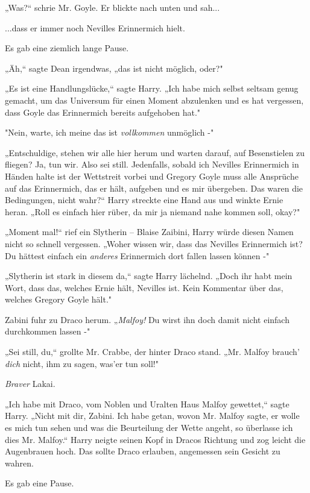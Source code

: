 {„Was?“ schrie Mr. Goyle. Er blickte nach unten und sah...

...dass er immer noch Nevilles Erinnermich hielt.

Es gab eine ziemlich lange Pause.

„Äh,“ sagte Dean irgendwas, „das ist nicht möglich, oder?"

„Es ist eine Handlungslücke,“ sagte Harry. „Ich habe mich selbst seltsam genug gemacht, um das Universum für einen Moment abzulenken und es hat vergessen, dass Goyle das Erinnermich bereits aufgehoben hat."

"Nein, warte, ich meine das ist \emph{vollkommen} unmöglich -"

„Entschuldige, stehen wir alle hier herum und warten darauf, auf Besenstielen zu fliegen? Ja, tun wir. Also sei still. Jedenfalls, sobald ich Nevilles Erinnermich in Händen halte ist der Wettstreit vorbei und Gregory Goyle muss alle Ansprüche auf das Erinnermich, das er hält, aufgeben und es mir übergeben. Das waren die Bedingungen, nicht wahr?“ Harry streckte eine Hand aus und winkte Ernie heran. „Roll es einfach hier rüber, da mir ja niemand nahe kommen soll, okay?"

„Moment mal!“ rief ein Slytherin -- Blaise Zaibini, Harry würde diesen Namen nicht so schnell vergessen. „Woher wissen wir, dass das Nevilles Erinnermich ist? Du hättest einfach ein \emph{anderes} Erinnermich dort fallen lassen können -"

„Slytherin ist stark in diesem da,“ sagte Harry lächelnd. „Doch ihr habt mein Wort, dass das, welches Ernie hält, Nevilles ist. Kein Kommentar über das, welches Gregory Goyle hält."

Zabini fuhr zu Draco herum. „\emph{Malfoy!} Du wirst ihn doch damit nicht einfach durchkommen lassen -"

„Sei still, du,“ grollte Mr. Crabbe, der hinter Draco stand. „Mr. Malfoy brauch' \emph{dich} nicht, ihm zu sagen, was'er tun soll!"

\emph{Braver} Lakai.

„Ich habe mit Draco, vom Noblen und Uralten Haus Malfoy gewettet,“ sagte Harry. „Nicht mit dir, Zabini. Ich habe getan, wovon Mr. Malfoy sagte, er wolle es mich tun sehen und was die Beurteilung der Wette angeht, so überlasse ich dies Mr. Malfoy.“ Harry neigte seinen Kopf in Dracos Richtung und zog leicht die Augenbrauen hoch. Das sollte Draco erlauben, angemessen sein Gesicht zu wahren.

Es gab eine Pause.

}
